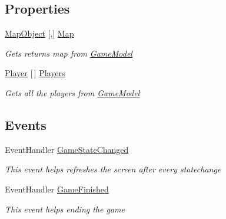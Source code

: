 \subsection*{Properties}
\begin{DoxyCompactItemize}
\item 
\mbox{\hyperlink{class_bomberman_1_1_model_1_1_map_object}{Map\+Object}} \mbox{[},\mbox{]} \mbox{\hyperlink{class_bomberman_1_1_business_logic_1_1_game_logic_a0c0cb930c5ff2e65420cae21fd8563e9}{Map}}
\begin{DoxyCompactList}\small\item\em Gets returns map from \mbox{\hyperlink{class_bomberman_1_1_business_logic_1_1_game_model}{Game\+Model}} \end{DoxyCompactList}\item 
\mbox{\hyperlink{class_bomberman_1_1_model_1_1_player}{Player}} \mbox{[}$\,$\mbox{]} \mbox{\hyperlink{class_bomberman_1_1_business_logic_1_1_game_logic_a29d052d8d9a96d2a9c268d0fa447e502}{Players}}
\begin{DoxyCompactList}\small\item\em Gets all the players from \mbox{\hyperlink{class_bomberman_1_1_business_logic_1_1_game_model}{Game\+Model}} \end{DoxyCompactList}\end{DoxyCompactItemize}
\subsection*{Events}
\begin{DoxyCompactItemize}
\item 
Event\+Handler \mbox{\hyperlink{class_bomberman_1_1_business_logic_1_1_game_logic_a7d6ca589e415c4ad23a0554fdfde91e4}{Game\+State\+Changed}}
\begin{DoxyCompactList}\small\item\em This event helps refreshes the screen after every statechange \end{DoxyCompactList}\item 
Event\+Handler \mbox{\hyperlink{class_bomberman_1_1_business_logic_1_1_game_logic_afac06eda1eedc3b5fb9574b8e8e56f0f}{Game\+Finished}}
\begin{DoxyCompactList}\small\item\em This event helps ending the game \end{DoxyCompactList}\end{DoxyCompactItemize}
